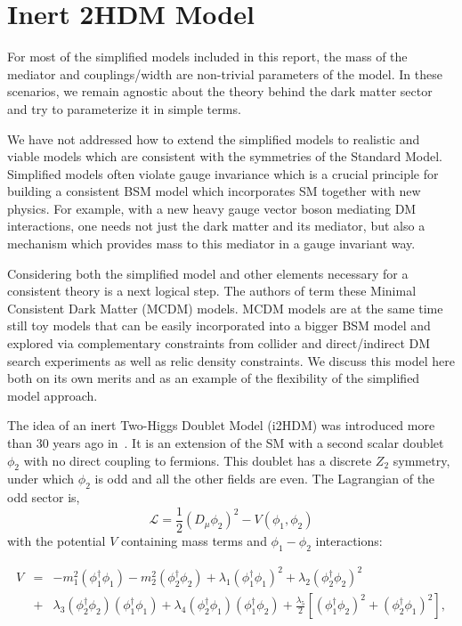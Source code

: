\section{Inert 2HDM Model}\label{sec:i2HDM}

For most of the simplified models included in this report, the mass of
the mediator and couplings/width are non-trivial parameters of the
model. In these scenarios, we remain agnostic about the theory behind
the dark matter sector and try to parameterize it in simple terms.

We have not addressed how to extend the simplified models to realistic
and viable models which are consistent with the symmetries of the
Standard Model. Simplified models often violate gauge invariance which
is a crucial principle for building a consistent BSM model which
incorporates SM together with new physics. For example, with a new
heavy gauge vector boson mediating DM interactions, one needs not just
the dark matter and its mediator, but also a mechanism which provides
mass to this mediator in a gauge invariant way.

Considering both the simplified model and other elements necessary for a consistent theory is a next logical step. The authors of \cite{Belyaev:2015tap} term these Minimal
Consistent Dark Matter (MCDM) models. MCDM models are at the same time still toy models that can be 
easily incorporated into a bigger BSM model and explored via
complementary constraints from collider and direct/indirect DM search
experiments as well as relic density constraints. We discuss this model here both on its own merits and as an example of the flexibility of the simplified model approach.

The idea of an inert Two-Higgs Doublet Model (i2HDM) was introduced
more than 30 years ago in~\cite{Deshpande:1977rw,LopezHonorez:2006gr,Dolle:2009fn,Goudelis:2013uca,Belyaev:2015tap}. It is an extension of the SM with a second scalar doublet $\phi_2$ with no direct coupling to fermions.  This doublet has a discrete $Z_2$ symmetry, under which $\phi_2$ is odd and all the other fields are even. 
The Lagrangian of the odd sector is,
\begin{equation}
  \mathcal{L} = \frac{1}{2}(D_{\mu}\phi_2)^2 -V(\phi_1,\phi_2)
\end{equation}
with the  potential $V$  containing mass terms and $\phi_1 - \phi_2$
interactions:
\begin{fullwidth}
  \begin{eqnarray}
    V &=& -m_1^2 (\phi_1^{\dagger}\phi_1) - m_2^2 (\phi_2^{\dagger}\phi_2) + \lambda_1 (\phi_1^{\dagger}\phi_1)^2 + \lambda_2 (\phi_2^{\dagger}\phi_2)^2    \nonumber  \\
      &+&  \lambda_3(\phi_2^{\dagger}\phi_2)(\phi_1^{\dagger}\phi_1)  + \lambda_4(\phi_2^{\dagger}\phi_1)(\phi_1^{\dagger}\phi_2) + 
          \frac{\lambda_5}{2}\left[(\phi_1^{\dagger}\phi_2)^2 + (\phi_2^{\dagger}\phi_1)^2 \right],
  \end{eqnarray}
\end{fullwidth}

